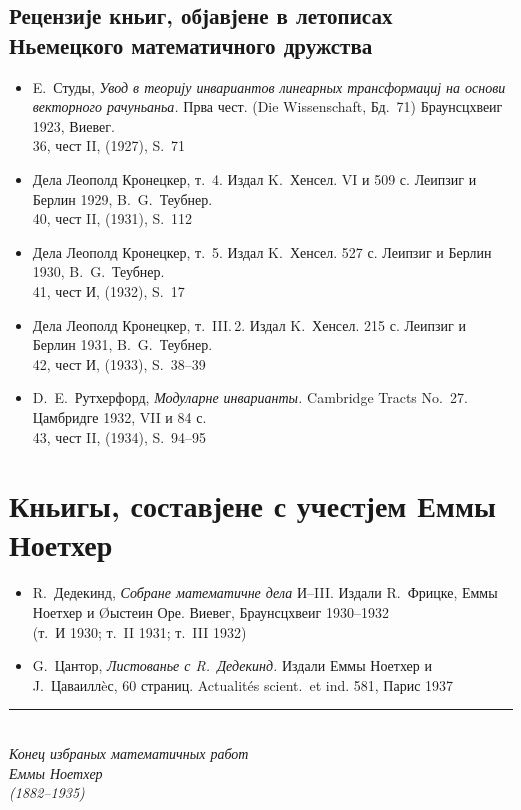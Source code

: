 \documentclass[11pt]{article}
\newcommand{\foreign}[1]{#1}
\begin{document}
\subsection*{Рецензије кньиг, објавјене в летописах Ньемецкого математичного дружства}

\begin{itemize}[leftmargin=1.5em,itemsep=0.2em]
\item E.\ Студы, \textit{Увод в теорију инвариантов линеарных трансформациј на основи векторного рачуньаньа.} Прва чест. (\foreign{Die Wissenschaft}, Бд.~71) Браунсцхвеиг 1923, Виевег.\\
36, чест II, (1927), S.~71

\item Дела Леополд Кронецкер, т.~4. Издал K.\ Хенсел. VI и 509 с. Леипзиг и Берлин 1929, B.\ G.\ Теубнер.\\
40, чест II, (1931), S.~112

\item Дела Леополд Кронецкер, т.~5. Издал K.\ Хенсел. 527 с. Леипзиг и Берлин 1930, B.\ G.\ Теубнер.\\
41, чест И, (1932), S.~17

\item Дела Леополд Кронецкер, т.~III.\,2. Издал K.\ Хенсел. 215 с. Леипзиг и Берлин 1931, B.\ G.\ Теубнер.\\
42, чест И, (1933), S.~38--39

\item D.\ E.\ Рутхерфорд, \textit{Модуларне инварианты.} \foreign{Cambridge Tracts No.~27.} Цамбридге 1932, VII и 84 с.\\
43, чест II, (1934), S.~94--95
\end{itemize}

\newpage
\section*{Кньигы, составјене с учестјем Еммы Ноетхер}

\begin{itemize}[leftmargin=1.5em,itemsep=0.5em]
\item R.\ Дедекинд, \textit{Собране математичне дела} И--III. Издали R.\ Фрицке, Еммы Ноетхер и Øыстеин Оре. Виевег, Браунсцхвеиг 1930--1932\\
(т.~И 1930; т.~II 1931; т.~III 1932)

\item G.\ Цантор, \textit{Листованье с R.\ Дедекинд.} Издали Еммы Ноетхер и J.\ Цаваиллèс, 60 страниц. \foreign{Actualités scient.\ et ind.} 581, Парис 1937
\end{itemize}

\vfill

\begin{center}
\rule{0.5\textwidth}{0.4pt}\\[1em]
\textit{Конец избраных математичных работ}\\[0.5em]
\textit{Еммы Ноетхер}\\[0.5em]
\textit{(1882--1935)}
\end{center}
\end{document}
